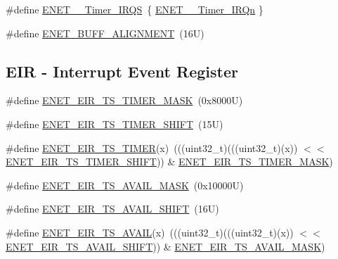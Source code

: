 \begin{DoxyCompactItemize}
\item 
\#define \mbox{\hyperlink{group___e_n_e_t___register___masks_gaef031de2fb3450ad7eb5d930f46d8b47}{E\+N\+E\+T\+\_\+\_\+\+Timer\+\_\+\+I\+R\+QS}}~\{ \mbox{\hyperlink{group___interrupt__vector__numbers_gga666eb0caeb12ec0e281415592ae89083abad338d6856a8f9b0d518a37d15d141c}{E\+N\+E\+T\+\_\+\_\+\+Timer\+\_\+\+I\+R\+Qn}} \}
\item 
\#define \mbox{\hyperlink{group___e_n_e_t___register___masks_ga0f83120d7461f8851bd187aa747693e4}{E\+N\+E\+T\+\_\+\+B\+U\+F\+F\+\_\+\+A\+L\+I\+G\+N\+M\+E\+NT}}~(16\+U)
\end{DoxyCompactItemize}
\subsection*{E\+IR -\/ Interrupt Event Register}
\begin{DoxyCompactItemize}
\item 
\#define \mbox{\hyperlink{group___e_n_e_t___register___masks_gabded92ce4206647b27b1107db2bb5088}{E\+N\+E\+T\+\_\+\+E\+I\+R\+\_\+\+T\+S\+\_\+\+T\+I\+M\+E\+R\+\_\+\+M\+A\+SK}}~(0x8000\+U)
\item 
\#define \mbox{\hyperlink{group___e_n_e_t___register___masks_ga40800c9bb4d99721c93e7d7031f96300}{E\+N\+E\+T\+\_\+\+E\+I\+R\+\_\+\+T\+S\+\_\+\+T\+I\+M\+E\+R\+\_\+\+S\+H\+I\+FT}}~(15\+U)
\item 
\#define \mbox{\hyperlink{group___e_n_e_t___register___masks_gab0fc7dbec45b0bb50dd909ad0204115c}{E\+N\+E\+T\+\_\+\+E\+I\+R\+\_\+\+T\+S\+\_\+\+T\+I\+M\+ER}}(x)~(((uint32\+\_\+t)(((uint32\+\_\+t)(x)) $<$$<$ \mbox{\hyperlink{group___e_n_e_t___register___masks_ga40800c9bb4d99721c93e7d7031f96300}{E\+N\+E\+T\+\_\+\+E\+I\+R\+\_\+\+T\+S\+\_\+\+T\+I\+M\+E\+R\+\_\+\+S\+H\+I\+FT}})) \& \mbox{\hyperlink{group___e_n_e_t___register___masks_gabded92ce4206647b27b1107db2bb5088}{E\+N\+E\+T\+\_\+\+E\+I\+R\+\_\+\+T\+S\+\_\+\+T\+I\+M\+E\+R\+\_\+\+M\+A\+SK}})
\item 
\#define \mbox{\hyperlink{group___e_n_e_t___register___masks_gae746d0a643c9d6e39e07623a1d944acc}{E\+N\+E\+T\+\_\+\+E\+I\+R\+\_\+\+T\+S\+\_\+\+A\+V\+A\+I\+L\+\_\+\+M\+A\+SK}}~(0x10000\+U)
\item 
\#define \mbox{\hyperlink{group___e_n_e_t___register___masks_gad811839fe8168bdb1e55007a785d132b}{E\+N\+E\+T\+\_\+\+E\+I\+R\+\_\+\+T\+S\+\_\+\+A\+V\+A\+I\+L\+\_\+\+S\+H\+I\+FT}}~(16\+U)
\item 
\#define \mbox{\hyperlink{group___e_n_e_t___register___masks_gad1fd8e789ec931b5d1fc49c2a18f9fdb}{E\+N\+E\+T\+\_\+\+E\+I\+R\+\_\+\+T\+S\+\_\+\+A\+V\+A\+IL}}(x)~(((uint32\+\_\+t)(((uint32\+\_\+t)(x)) $<$$<$ \mbox{\hyperlink{group___e_n_e_t___register___masks_gad811839fe8168bdb1e55007a785d132b}{E\+N\+E\+T\+\_\+\+E\+I\+R\+\_\+\+T\+S\+\_\+\+A\+V\+A\+I\+L\+\_\+\+S\+H\+I\+FT}})) \& \mbox{\hyperlink{group___e_n_e_t___register___masks_gae746d0a643c9d6e39e07623a1d944acc}{E\+N\+E\+T\+\_\+\+E\+I\+R\+\_\+\+T\+S\+\_\+\+A\+V\+A\+I\+L\+\_\+\+M\+A\+SK}})

\end{DoxyCompactItemize}
